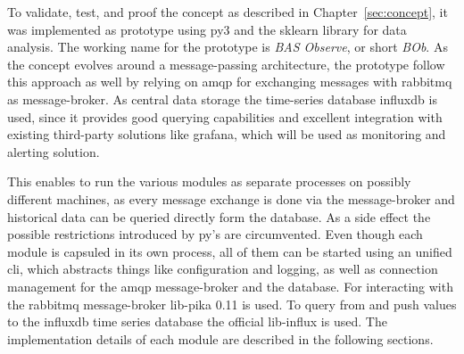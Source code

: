 
\begin{comment}
\begin{itemize}
	\item implementation in \gls{py} 3
	\item command line interface with subcommand as central entrypoint providing configuration and log management
	\item each process is run as separate processes to mitigate \gls{gil} limitations
	\item process has one task (agent simulator, collector, analyser module)
	\item modules/process pass messages mainly using \gls{amqp} and \gls{rabbitmq} as message broker
	\item reusing \gls{influxdb} and \gls{rabbitmq} by separating pipelines using a project name
\end{itemize}
\end{comment}

To validate, test, and proof the concept as described in Chapter~\ref{sec:concept}, it was implemented as prototype using \gls{py}3 and the \gls{sklearn} library for data analysis.
The working name for the prototype is \emph{BAS Observe}, or short \emph{BOb}.
As the concept evolves around a message-passing architecture, the prototype follow this approach as well by relying on \gls{amqp} for exchanging messages with \gls{rabbitmq} as message-broker. As central data storage the time-series database \gls{influxdb} is used, since it provides good querying capabilities and excellent integration with existing third-party solutions like \gls{grafana}, which will be used as monitoring and alerting solution.

This enables to run the various modules as separate processes on possibly different machines, as every message exchange is done via the message-broker and historical data can be queried directly form the database.
As a side effect the possible restrictions introduced by \gls{py}'s  are circumvented.
Even though each module is capsuled in its own process, all of them can be started using an unified \gls{cli}, which abstracts things like configuration and logging, as well as connection management for the \gls{amqp} message-broker and the database.
For interacting with the \gls{rabbitmq} message-broker \gls{lib-pika} 0.11 is used. To query from and push values to the \gls{influxdb} time series database the official \gls{lib-influx} is used.
The implementation details of each module are described in the following sections.

